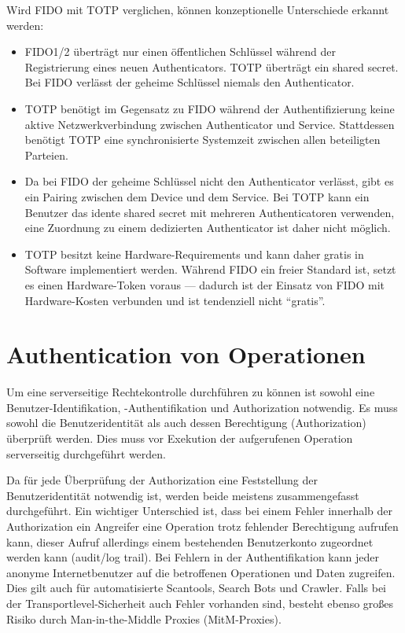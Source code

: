Wird FIDO mit TOTP verglichen, können konzeptionelle Unterschiede erkannt werden:

\begin{itemize}
	\item FIDO1/2 überträgt nur einen öffentlichen Schlüssel während der Registrierung eines neuen Authenticators. TOTP überträgt ein shared secret. Bei FIDO verlässt der geheime Schlüssel niemals den Authenticator.
	\item TOTP benötigt im Gegensatz zu FIDO während der Authentifizierung keine aktive Netzwerkverbindung zwischen Authenticator und Service. Stattdessen benötigt TOTP eine synchronisierte Systemzeit zwischen allen beteiligten Parteien.
	\item Da bei FIDO der geheime Schlüssel nicht den Authenticator verlässt, gibt es ein Pairing zwischen dem Device und dem Service. Bei TOTP kann ein Benutzer das idente shared secret mit mehreren Authenticatoren verwenden, eine Zuordnung zu einem dedizierten Authenticator ist daher nicht möglich.
	\item TOTP besitzt keine Hardware-Requirements und kann daher gratis in Software implementiert werden. Während FIDO ein freier Standard ist, setzt es einen Hardware-Token voraus --- dadurch ist der Einsatz von FIDO mit Hardware-Kosten verbunden und ist tendenziell nicht ``gratis''.
\end{itemize}

\section{Authentication von Operationen}

Um eine serverseitige Rechtekontrolle durchführen zu können ist sowohl eine Benutzer-Identifikation, -Authentifikation und Authorization notwendig. Es muss sowohl die Benutzeridentität als auch dessen Berechtigung (Authorization) überprüft werden. Dies muss vor Exekution der aufgerufenen Operation serverseitig durchgeführt werden.

Da für jede Überprüfung der Authorization eine Feststellung der Benutzeridentität notwendig ist, werden beide meistens zusammengefasst durchgeführt. Ein wichtiger Unterschied ist, dass bei einem Fehler innerhalb der Authorization ein Angreifer eine Operation trotz fehlender Berechtigung aufrufen kann, dieser Aufruf allerdings einem bestehenden Benutzerkonto zugeordnet werden kann (audit/log trail). Bei Fehlern in der Authentifikation kann jeder anonyme Internetbenutzer auf die betroffenen Operationen und Daten zugreifen. Dies gilt auch für automatisierte Scantools, Search Bots und Crawler. Falls bei der Transportlevel-Sicherheit auch Fehler vorhanden sind, besteht ebenso großes Risiko durch Man-in-the-Middle Proxies (MitM-Proxies).

